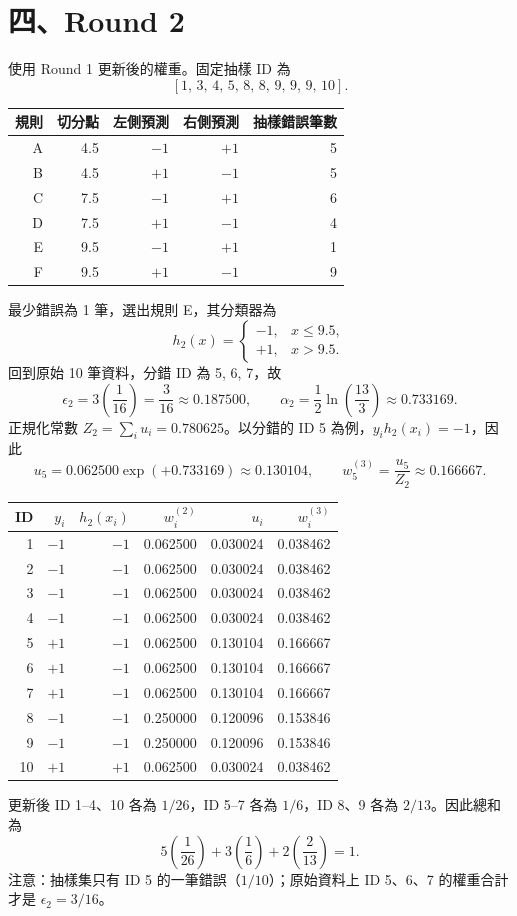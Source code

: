 \section*{四、Round 2}
使用 Round 1 更新後的權重。固定抽樣 ID 為 \[[1,\,3,\,4,\,5,\,8,\,8,\,9,\,9,\,9,\,10].\]
\begin{center}
\label{tab:round2}
\begin{tabular}{rrrrr}
\toprule
規則 & 切分點 & 左側預測 & 右側預測 & 抽樣錯誤筆數 \\
\midrule
A & 4.5 & $-1$ & $+1$ & 5 \\
B & 4.5 & $+1$ & $-1$ & 5 \\
C & 7.5 & $-1$ & $+1$ & 6 \\
D & 7.5 & $+1$ & $-1$ & 4 \\
E & 9.5 & $-1$ & $+1$ & 1 \\
F & 9.5 & $+1$ & $-1$ & 9 \\
\bottomrule
\end{tabular}
\end{center}
最少錯誤為 1 筆，選出規則 E，其分類器為
\[h_2(x)=\begin{cases}-1,&x\le 9.5,\\+1,&x>9.5.\end{cases}\]
回到原始 10 筆資料，分錯 ID 為 5, 6, 7，故
\[\epsilon_2=3\left(\frac1{16}\right)=\frac3{16}\approx 0.187500,\qquad \alpha_2=\frac12\ln\left(\frac{13}{3}\right)\approx 0.733169.\]
正規化常數 $Z_2=\sum_i u_i=0.780625$。以分錯的 ID 5 為例，$y_i h_2(x_i)=-1$，因此
\[u_{5}=0.062500\exp(+0.733169)\approx 0.130104,\qquad w_{5}^{(3)}=\frac{u_{5}}{Z_2}\approx 0.166667.\]
\begin{center}
\label{tab:weights2}
\begin{tabular}{rrrrrr}
\toprule
ID & $y_i$ & $h_2(x_i)$ & $w_i^{(2)}$ & $u_i$ & $w_i^{(3)}$ \\
\midrule
1 & $-1$ & $-1$ & 0.062500 & 0.030024 & 0.038462 \\
2 & $-1$ & $-1$ & 0.062500 & 0.030024 & 0.038462 \\
3 & $-1$ & $-1$ & 0.062500 & 0.030024 & 0.038462 \\
4 & $-1$ & $-1$ & 0.062500 & 0.030024 & 0.038462 \\
5 & $+1$ & $-1$ & 0.062500 & 0.130104 & 0.166667 \\
6 & $+1$ & $-1$ & 0.062500 & 0.130104 & 0.166667 \\
7 & $+1$ & $-1$ & 0.062500 & 0.130104 & 0.166667 \\
8 & $-1$ & $-1$ & 0.250000 & 0.120096 & 0.153846 \\
9 & $-1$ & $-1$ & 0.250000 & 0.120096 & 0.153846 \\
10 & $+1$ & $+1$ & 0.062500 & 0.030024 & 0.038462 \\
\bottomrule
\end{tabular}
\end{center}
更新後 ID 1--4、10 各為 $1/26$，ID 5--7 各為 $1/6$，ID 8、9 各為 $2/13$。因此總和為
\[5\left(\frac1{26}\right)+3\left(\frac16\right)+2\left(\frac2{13}\right)=1.\]
注意：抽樣集只有 ID 5 的一筆錯誤（$1/10$）；原始資料上 ID 5、6、7 的權重合計才是 $\epsilon_2=3/16$。
